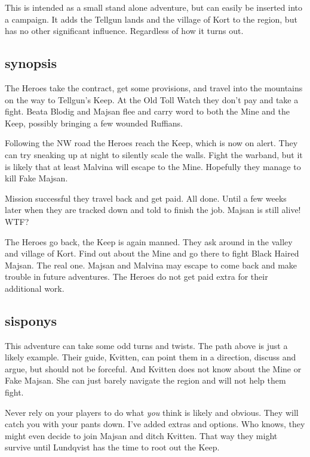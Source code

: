 \vspace{2.0\baselineskip}


\noindent
This is intended as a small stand alone adventure, but can easily be inserted into a campaign. It adds the Tellgun lands and the village of Kort to the region, but has no other significant influence. Regardless of how it turns out.


\subsection*{synopsis}
The Heroes take the contract, get some provisions, and travel into the mountains on the way to Tellgun's Keep. At the Old Toll Watch they don't pay and take a fight. Beata Blodig and Majsan flee and carry word to both the Mine and the Keep, possibly bringing a few wounded Ruffians.

Following the NW road the Heroes reach the Keep, which is now on alert. They can try sneaking up at night to silently scale the walls. Fight the warband, but it is likely that at least Malvina will escape to the Mine. Hopefully they manage to kill Fake Majsan.

Mission successful they travel back and get paid. All done. Until a few weeks later when they are tracked down and told to finish the job. Majsan is still alive! WTF?

The Heroes go back, the Keep is again manned. They ask around in the valley and village of Kort. Find out about the Mine and go there to fight Black Haired Majsan. The real one. Majsan and Malvina may escape to come back and make trouble in future adventures. The Heroes do not get paid extra for their additional work.


\subsection*{sisponys}
This adventure can take some odd turns and twists. The path above is just a likely example. Their guide, Kvitten, can point them in a direction, discuss and argue, but should not be forceful. And Kvitten does not know about the Mine or Fake Majsan. She can just barely navigate the region and will not help them fight.

Never rely on your players to do what \textit{you} think is likely and obvious. They will catch you with your pants down. I've added extras and options. Who knows, they might even decide to join Majsan and ditch Kvitten. That way they might survive until Lundqvist has the time to root out the Keep.


